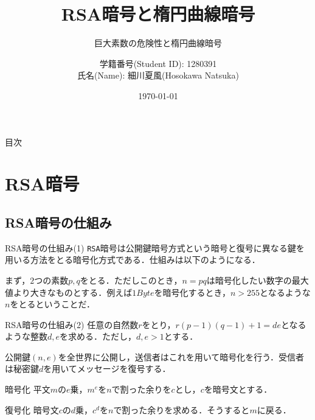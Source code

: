 \documentclass[11pt, aspectratio=169]{beamer}
\title{RSA暗号と楕円曲線暗号}
\subtitle{巨大素数の危険性と楕円曲線暗号}
\author{学籍番号(Student ID): 1280391 \\ 氏名(Name): 細川夏風(Hosokawa Natsuka)}
\institute{高知工科大学(Kochi Univ of Tech)}
\date{\today}
\begin{document}
\begin{frame}
    \titlepage
\end{frame}

\begin{frame}{目次}
    \tableofcontents
\end{frame}


\section{RSA暗号}
\subsection{RSA暗号の仕組み}

\begin{frame}{RSA暗号の仕組み(1)}
  \texttt{RSA}暗号は公開鍵暗号方式という暗号と復号に異なる鍵を用いる方法をとる暗号化方式である．仕組みは以下のようになる．

  \vspace{1em}

  \label{mecanism}

  まず，$2$つの素数$p, q$をとる．ただしこのとき，$n = pq$は暗号化したい数字の最大値より大きなものとする．例えば$1Byte$を暗号化するとき，$n > 255$となるような$n$をとるということだ．
\end{frame}

\begin{frame}{RSA暗号の仕組み(2)}
  任意の自然数$r$をとり，$r(p-1)(q-1) + 1 = de$となるような整数$d,e$を求める．ただし，$d, e > 1$とする．

  \vspace{1em}

  公開鍵$(n, e)$を全世界に公開し，送信者はこれを用いて暗号化を行う．受信者は秘密鍵$d$を用いてメッセージを復号する．

  \begin{block}{暗号化}
    平文$m$の$e$乗，$m^e$を$n$で割った余りを$c$とし，$c$を暗号文とする．
  \end{block}

  \begin{block}{復号化}
    暗号文$c$の$d$乗，$c^d$を$n$で割った余りを求める．そうすると$m$に戻る．
  \end{block}

\end{frame}
\end{document}
